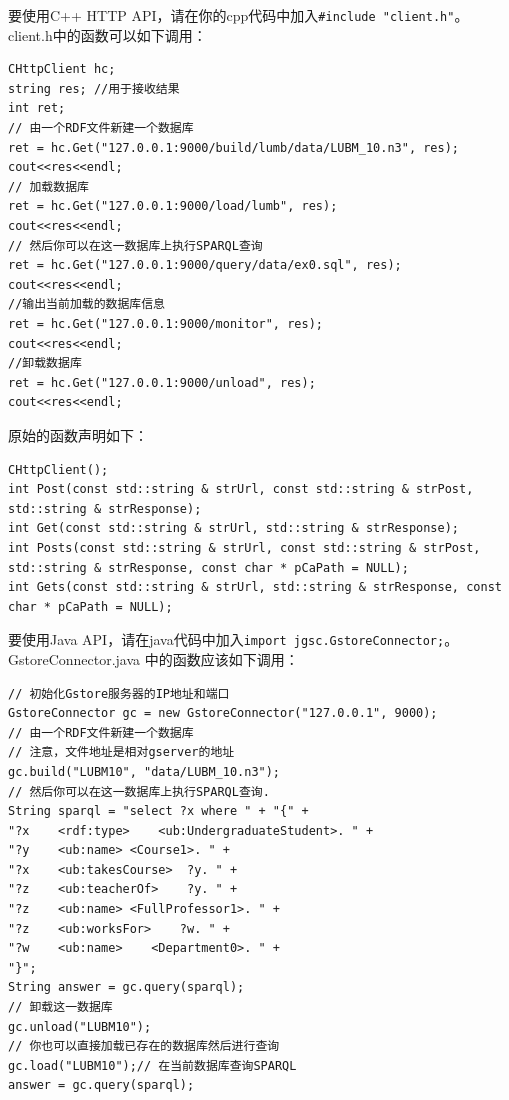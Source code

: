 \documentclass[titlepage, a4paper, 12pt]{article}
\makeatletter
\newcommand{\xiaosihao}{\fontsize{12pt}{\baselineskip}\selectfont}
\renewcommand\subsubsection{\@startsection{subsubsection}{1}{\z@}%
{-1ex \@plus -.5ex \@minus -.2ex}%
{.3ex \@plus .1ex}%
{\normalfont\xiaosihao\CJKfamily{hei}}}
\makeatother
\begin{document}

要使用C++ HTTP API，请在你的cpp代码中加入\texttt{\#include\ "client.h"}。client.h中的函数可以如下调用：

\begin{verbatim}
CHttpClient hc;
string res; //用于接收结果
int ret;
// 由一个RDF文件新建一个数据库
ret = hc.Get("127.0.0.1:9000/build/lumb/data/LUBM_10.n3", res);
cout<<res<<endl;
// 加载数据库
ret = hc.Get("127.0.0.1:9000/load/lumb", res);
cout<<res<<endl;
// 然后你可以在这一数据库上执行SPARQL查询
ret = hc.Get("127.0.0.1:9000/query/data/ex0.sql", res);
cout<<res<<endl;
//输出当前加载的数据库信息
ret = hc.Get("127.0.0.1:9000/monitor", res);
cout<<res<<endl;
//卸载数据库
ret = hc.Get("127.0.0.1:9000/unload", res);
cout<<res<<endl;

\end{verbatim}

原始的函数声明如下：

\begin{verbatim}
CHttpClient();
int Post(const std::string & strUrl, const std::string & strPost, std::string & strResponse);
int Get(const std::string & strUrl, std::string & strResponse);
int Posts(const std::string & strUrl, const std::string & strPost, std::string & strResponse, const char * pCaPath = NULL);
int Gets(const std::string & strUrl, std::string & strResponse, const char * pCaPath = NULL);
\end{verbatim}


\hyperdef{}{http-java-api}{\subsubsection{Java API}\label{http-java-api}}


要使用Java API，请在java代码中加入\texttt{import\ jgsc.GstoreConnector;}。GstoreConnector.java 中的函数应该如下调用：

\begin{verbatim}
// 初始化Gstore服务器的IP地址和端口
GstoreConnector gc = new GstoreConnector("127.0.0.1", 9000);
// 由一个RDF文件新建一个数据库
// 注意，文件地址是相对gserver的地址
gc.build("LUBM10", "data/LUBM_10.n3");
// 然后你可以在这一数据库上执行SPARQL查询.
String sparql = "select ?x where " + "{" +
"?x    <rdf:type>    <ub:UndergraduateStudent>. " +
"?y    <ub:name> <Course1>. " +
"?x    <ub:takesCourse>  ?y. " +
"?z    <ub:teacherOf>    ?y. " +
"?z    <ub:name> <FullProfessor1>. " +
"?z    <ub:worksFor>    ?w. " +
"?w    <ub:name>    <Department0>. " +
"}";
String answer = gc.query(sparql);
// 卸载这一数据库
gc.unload("LUBM10");
// 你也可以直接加载已存在的数据库然后进行查询
gc.load("LUBM10");// 在当前数据库查询SPARQL
answer = gc.query(sparql);
\end{verbatim}
\end{document}
